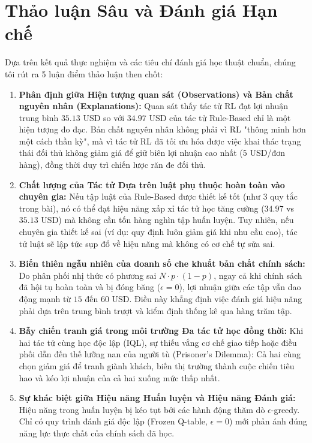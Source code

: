 \documentclass[12pt,a4paper]{article}
\begin{document}
\section{Thảo luận Sâu và Đánh giá Hạn chế}

Dựa trên kết quả thực nghiệm và các tiêu chí đánh giá học thuật chuẩn, chúng tôi rút ra 5 luận điểm thảo luận then chốt:
\begin{enumerate}
    \item \textbf{Phân định giữa Hiện tượng quan sát (Observations) và Bản chất nguyên nhân (Explanations):} 
    Quan sát thấy tác tử RL đạt lợi nhuận trung bình $35.13$ USD so với $34.97$ USD của tác tử Rule-Based chỉ là một hiện tượng đo đạc. Bản chất nguyên nhân không phải vì RL "thông minh hơn một cách thần kỳ", mà vì tác tử RL đã tối ưu hóa được việc khai thác trạng thái đối thủ không giảm giá để giữ biên lợi nhuận cao nhất ($5$ USD/đơn hàng), đồng thời duy trì chiến lược răn đe đối thủ.
    \item \textbf{Chất lượng của Tác tử Dựa trên luật phụ thuộc hoàn toàn vào chuyên gia:}
    Nếu tập luật của Rule-Based được thiết kế tốt (như 3 quy tắc trong bài), nó có thể đạt hiệu năng xấp xỉ tác tử học tăng cường ($34.97$ vs $35.13$ USD) mà không cần tốn hàng nghìn tập huấn luyện. Tuy nhiên, nếu chuyên gia thiết kế sai (ví dụ: quy định luôn giảm giá khi nhu cầu cao), tác tử luật sẽ lập tức sụp đổ về hiệu năng mà không có cơ chế tự sửa sai.
    \item \textbf{Biến thiên ngẫu nhiên của doanh số che khuất bản chất chính sách:}
    Do phân phối nhị thức có phương sai $N \cdot p \cdot (1 - p)$, ngay cả khi chính sách đã hội tụ hoàn toàn và bị đóng băng ($\epsilon=0$), lợi nhuận giữa các tập vẫn dao động mạnh từ $15$ đến $60$ USD. Điều này khẳng định việc đánh giá hiệu năng phải dựa trên trung bình trượt và kiểm định thống kê qua hàng trăm tập.
    \item \textbf{Bẫy chiến tranh giá trong môi trường Đa tác tử học đồng thời:}
    Khi hai tác tử cùng học độc lập (IQL), sự thiếu vắng cơ chế giao tiếp hoặc điều phối dẫn đến thế lưỡng nan của người tù (Prisoner's Dilemma): Cả hai cùng chọn giảm giá để tranh giành khách, biến thị trường thành cuộc chiến tiêu hao và kéo lợi nhuận của cả hai xuống mức thấp nhất.
    \item \textbf{Sự khác biệt giữa Hiệu năng Huấn luyện và Hiệu năng Đánh giá:}
    Hiệu năng trong huấn luyện bị kéo tụt bởi các hành động thăm dò $\epsilon$-greedy. Chỉ có quy trình đánh giá độc lập (Frozen Q-table, $\epsilon=0$) mới phản ánh đúng năng lực thực chất của chính sách đã học.
\end{enumerate}
\end{document}
